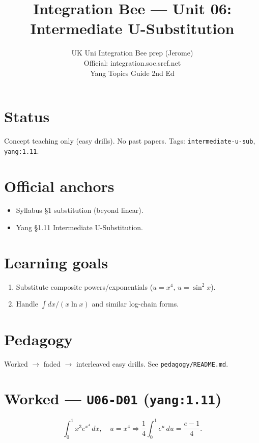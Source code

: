 
\title{Integration Bee --- Unit 06:\\ Intermediate U-Substitution}
\author{UK Uni Integration Bee prep (Jerome)\\ Official: integration.soc.srcf.net\\ Yang Topics Guide 2nd Ed}
\date{}

\maketitle

\section*{Status}
Concept teaching only (easy drills). No past papers.
Tags: \texttt{intermediate-u-sub}, \texttt{yang:1.11}.

\section{Official anchors}
\begin{itemize}
  \item Syllabus §1 substitution (beyond linear).
  \item Yang §1.11 Intermediate U-Substitution.
\end{itemize}

\section{Learning goals}
\begin{enumerate}
  \item Substitute composite powers/exponentials ($u=x^4$, $u=\sin^2 x$).
  \item Handle $\int dx/(x\ln x)$ and similar log-chain forms.
\end{enumerate}

\section{Pedagogy}
Worked $\to$ faded $\to$ interleaved easy drills. See \texttt{pedagogy/README.md}.


\section{Worked --- \texttt{U06-D01} (\texttt{yang:1.11})}
\[
\int_0^1 x^3 e^{x^4}\,dx,\quad u=x^4\Rightarrow \frac14\int_0^1 e^u\,du=\frac{e-1}{4}.
\]

